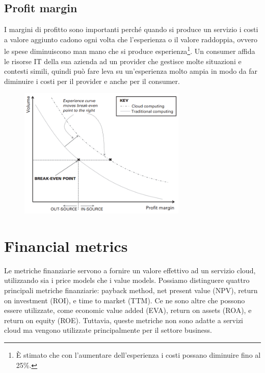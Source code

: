 \subsection{Profit margin}
I margini di profitto sono importanti perché quando si produce un servizio i costi a valore aggiunto cadono ogni volta che l'esperienza o il valore raddoppia, ovvero le spese diminuiscono man mano che si produce esperienza\footnote{È stimato che con l'aumentare dell'esperienza i costi possano diminuire fino al 25\%.}. Un consumer affida le risorse IT della sua azienda ad un provider che gestisce molte situazioni e contesti simili, quindi può fare leva su un'esperienza molto ampia in modo da far diminuire i costi per il provider e anche per il consumer.
\clearpage
\begin{figure}[htb!]
    \centering
    \includegraphics[width=8cm]{./Images/cap6/6.10.png}
\end{figure}

\section{Financial metrics}
Le metriche finanziarie servono a fornire un valore effettivo ad un servizio cloud, utilizzando sia i price models che i value models. Possiamo distinguere quattro principali metriche finanziarie: payback method, net present value (NPV), return on investment (ROI), e time to market (TTM). Ce ne sono altre che possono essere utilizzate, come economic value added (EVA), return on assets (ROA), e return on equity (ROE). Tuttavia, queste metriche non sono adatte a servizi cloud ma vengono utilizzate principalmente per il settore business.

